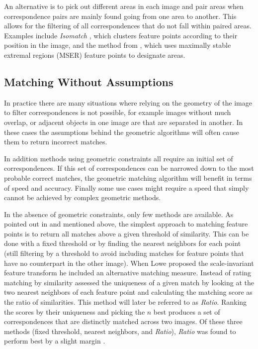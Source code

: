 An alternative is to pick out different areas in each image and pair 
areas when correspondence pairs are mainly found going from one area to 
another. This allows for the filtering of all correspondences that do 
not fall within paired areas. Examples include \emph{Isomatch} 
\cite{das2008event}, which clusters feature points according to their 
position in the image, and the method from \cite{wu2011robust}, which 
uses maximally stable extremal regions (MSER) feature points to 
designate areas. 

\subsection{Matching Without Assumptions}

In practice there are many situations where relying on the geometry of 
the image to filter correspondences is not possible, for example images 
without much overlap, or adjacent objects in one image are that are 
separated in another. In these cases the assumptions behind the 
geometric algorithms will often cause them to return incorrect matches.  

In addition methods using geometric constraints all require an initial 
set of correspondences. If this set of correspondences can be narrowed 
down to the most probable correct matches, the geometric matching 
algorithm will benefit in terms of speed and accuracy.  Finally some use 
cases might require a speed that simply cannot be achieved by complex 
geometric methods.

In the absence of geometric constraints, only few methods are available.  
As pointed out in \cite{szeliski2010} and mentioned above, the simplest 
approach to matching feature points is to return all matches above a 
given threshold of similarity.  This can be done with a fixed threshold 
or by finding the nearest neighbors for each point (still filtering by a 
threshold to avoid including matches for feature points that have no 
counterpart in the other image).  When Lowe \cite{lowe2004sift} proposed 
the scale-invariant feature transform he included an alternative 
matching measure. Instead of rating matching by similarity assessed the 
uniqueness of a given match by looking at the two nearest neighbors of 
each feature point and calculating the matching score as the ratio of 
similarities. This method will later be referred to as \emph{Ratio}.  
Ranking the scores by their uniqueness and picking the $n$ best produces 
a set of correspondences that are distinctly matched across two images.  
Of these three methods (fixed threshold, nearest neighbors, and 
\emph{Ratio}), \emph{Ratio} was found to perform best by a slight margin 
\cite{mikolajczyk2005performance}.

